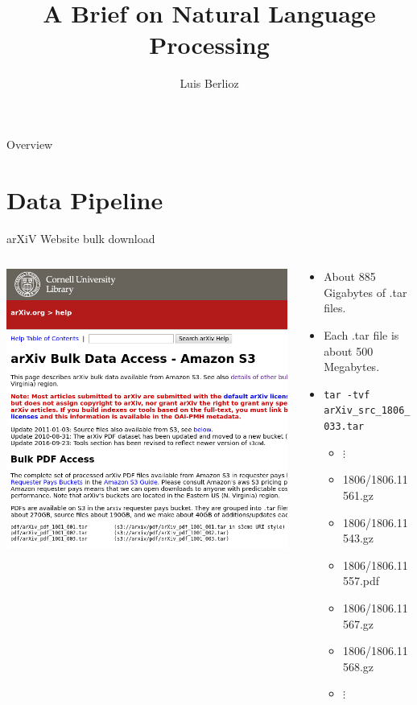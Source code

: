 \documentclass[9pt]{beamer}
\title{A Brief on Natural Language Processing}
\author{Luis Berlioz}
\begin{document}

\begin{frame}{Overview} 
     \tableofcontents
\end{frame}

\section{Data Pipeline}
\begin{frame}{arXiV Website bulk download}
    \begin{columns}[T]
        \begin{column}{0.4\textwidth}
    \includegraphics[width=\textwidth]{bulk_download.png} 
        \end{column}
        \begin{column}{0.6\textwidth}
            \begin{itemize}
                \item About 885 Gigabytes of .tar files.
                \item Each .tar file is about 500 Megabytes.
                \item \texttt{tar -tvf arXiv\_src\_1806\_033.tar}
                    \begin{itemize}
\item \hspace{4em}      $\vdots$
\item 1806/1806.11561.gz
\item 1806/1806.11543.gz
\item 1806/1806.11557.pdf
\item 1806/1806.11567.gz
\item 1806/1806.11568.gz
\item \hspace{4em}      $\vdots$
\end{itemize}



\end{itemize}
\end{column}
\end{columns}
\end{frame}
\end{document}
